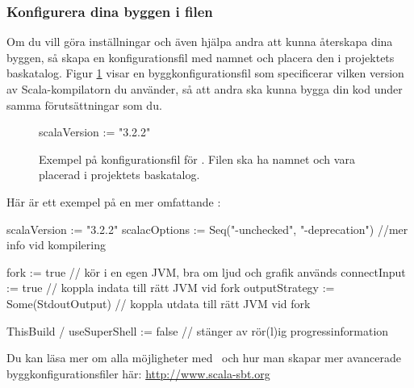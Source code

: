 \subsubsection{Konfigurera dina byggen i filen }

Om du vill göra inställningar och även hjälpa andra att kunna återskapa dina byggen, så skapa en konfigurationsfil med namnet  och placera den i projektets baskatalog. Figur \ref{fig:sbt:build-file} visar en byggkonfigurationsfil som specificerar vilken version av Scala-kompilatorn du använder, så att andra ska kunna bygga din kod under samma förutsättningar som du.

\begin{figure}[H]
\centering
\begin{Code}
scalaVersion := "3.2.2"
\end{Code}
\caption{Exempel på konfigurationsfil för \sbt. Filen ska ha namnet  och vara placerad i projektets baskatalog.}
\label{fig:sbt:build-file}
\end{figure}

\noindent Här är ett exempel på en mer omfattande :
\begin{CodeSmall}
scalaVersion   := "3.2.2"
scalacOptions  := Seq("-unchecked", "-deprecation") //mer info vid kompilering

fork           := true   // kör i en egen JVM, bra om ljud och grafik används 
connectInput   := true   // koppla indata till rätt JVM vid fork
outputStrategy := Some(StdoutOutput)  // koppla utdata till rätt JVM vid fork

ThisBuild / useSuperShell := false // stänger av rör(l)ig progressinformation
\end{CodeSmall}

\noindent Du kan läsa mer om alla möjligheter med \sbt\ och hur man skapar mer avancerade byggkonfigurationsfiler här: \url{http://www.scala-sbt.org}


